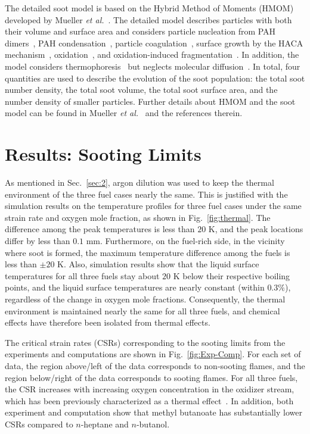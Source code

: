 \documentclass[review,3p,times]{elsarticleUS}
\begin{document}
The detailed soot model is based on the Hybrid Method of Moments (HMOM) developed by Mueller \emph{et al.}~\cite{mueller09a,mueller09b,mueller11a}. The detailed model describes particles with both their volume and surface area and considers particle nucleation from PAH dimers~\cite{schuetz02,wong09,blanquart09c}, PAH condensation~\cite{park03,mitchell98,mitchell03}, particle coagulation~\cite{mueller09b}, surface growth by the HACA mechanism~\cite{frenklach91}, oxidation~\cite{kazakov95,neoh81}, and oxidation-induced fragmentation~\cite{mueller11a}. In addition, the model considers thermophoresis~\cite{waldmann66} but neglects molecular diffusion~\cite{bisetti12}. In total, four quantities are used to describe the evolution of the soot population: the total soot number density, the total soot volume, the total soot surface area, and the number density of smaller particles.  Further details about HMOM and the soot model can be found in Mueller \emph{et al.}~\cite{mueller09a,mueller09b,mueller11a} and the references therein.

\section{Results: Sooting Limits}
\label{sec:4}

As mentioned in Sec.~\ref{sec:2}, argon dilution was used to keep the thermal environment of the three fuel cases nearly the same.  This is justified with the simulation results on the temperature profiles for three fuel cases under the same strain rate and oxygen mole fraction, as shown in Fig.~\ref{fig:thermal}.  The difference among the peak temperatures is less than $20$ K, and the peak locations differ by less than $0.1$ mm.  Furthermore, on the fuel-rich side, in the vicinity where soot is formed, the maximum temperature difference among the fuels is less than $\pm20$ K.  Also, simulation results show that the liquid surface temperatures for all three fuels stay about $20$ K below their respective boiling points, and the liquid surface temperatures are nearly constant (within $0.3\%$), regardless of the change in oxygen mole fractions.  Consequently, the thermal environment is maintained nearly the same for all three fuels, and chemical effects have therefore been isolated from thermal effects. 


The critical strain rates (CSRs) corresponding to the sooting limits from the experiments and computations are shown in Fig.~\ref{fig:Exp-Comp}. For each set of data, the region above/left of the data corresponds to non-sooting flames, and the region below/right of the data corresponds to sooting flames. For all three fuels, the CSR increases with increasing oxygen concentration in the oxidizer stream, which has been previously characterized as a thermal effect~\cite{du91}. In addition, both experiment and computation show that methyl butanoate has substantially lower CSRs compared to  $n$-heptane and $n$-butanol. 
\end{document}
